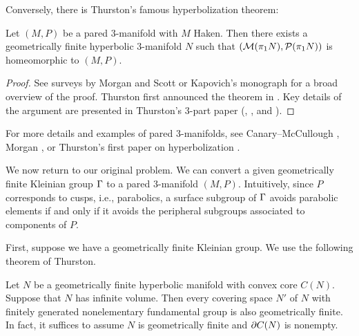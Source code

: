 Conversely, there is Thurston's famous hyperbolization theorem:

\begin{thm}

Let $(M,P)$ be a pared $3$-manifold with $M$ Haken. Then there exists
a geometrically finite hyperbolic $3$-manifold $N$ such that
$(\mathcal{M}(\pi_1N),\mathcal{P}(\pi_1N))$ is homeomorphic to $(M,P)$.

\end{thm}

\begin{proof}

See surveys by Morgan \cite{Mo} and Scott \cite{ThurstonviaScott} or Kapovich's
monograph \cite{Kapovich} for a broad overview of the proof. Thurston first
announced the theorem in \cite{Thurston0}. Key details of the argument are
presented in Thurston's 3-part paper (\cite{ThurstonI}, \cite{ThurstonII}, and
\cite{ThurstonIII}).

\end{proof}

For more details and examples of pared $3$-manifolds, see Canary--McCullough
\cite{CMc}, Morgan \cite{Mo}, or Thurston's first paper on hyperbolization
\cite{ThurstonI}.

We now return to our original problem. We can convert a given geometrically
finite Kleinian group $\Gamma$ to a pared $3$-manifold $(M,P)$. Intuitively, since
$P$ corresponds to cusps, i.e., parabolics, a surface subgroup of $\Gamma$ avoids
parabolic elements if and only if it avoids the peripheral subgroups associated
to components of $P$.

First, suppose we have a geometrically finite Kleinian group.  We use the
following theorem of Thurston.

\begin{thm}

Let $N$ be a geometrically finite hyperbolic manifold with convex core $C(N)$.
Suppose that $N$ has infinite volume. Then every covering space $N'$ of $N$
with finitely generated nonelementary fundamental group is also geometrically
finite. In fact, it suffices to assume $N$ is geometrically finite and $\partial
C(N)$ is nonempty.


\end{thm}

